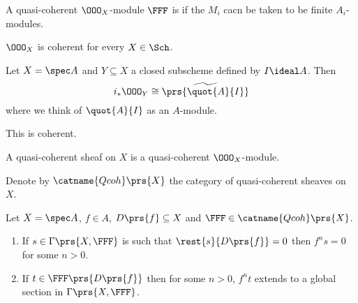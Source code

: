 \documentclass[10pt,a4paper,twoside,openany,hidelinks]{book}
\begin{document}
\begin{definition}
A quasi-coherent $\OOO_X$-module $\FFF$ is  if the $M_i$ cacn be taken to be finite $A_i$-modules.
\end{definition}

\begin{remark}
$\OOO_X$ is coherent for every $X \in \Sch$.
\end{remark}

\begin{example}
Let $X = \spec A$ and $Y \subseteq X$ a closed subscheme defined by $I \ideal A$. Then
\[i_* \OOO_Y \cong \widetilde{\prs{\quot{A}{I}}}\]
where we think of $\quot{A}{I}$ as an $A$-module.

This is coherent.
\end{example}

\begin{definition}
A quasi-coherent sheaf on $X$ is a quasi-coherent $\OOO_X$-module.
\end{definition}

\begin{notation}
Denote by $\catname{Qcoh}\prs{X}$ the category of quasi-coherent sheaves on $X$.
\end{notation}

\begin{lemma}\label{lemma:quasi-coherent}
Let $X = \spec A$, $f \in A$, $D\prs{f} \subseteq X$ and $\FFF \in \catname{Qcoh}\prs{X}$.
\begin{enumerate}
\item If $s \in \Gamma\prs{X,\FFF}$ is such that $\rest{s}{D\prs{f}} = 0$ then $f^n s = 0$ for some $n > 0$.
\item If $t \in \FFF\prs{D\prs{f}}$ then for some $n>0$, $f^n t$ extends to a global section in $\Gamma\prs{X, \FFF}$.
\end{enumerate}
\end{lemma}
\end{document}
